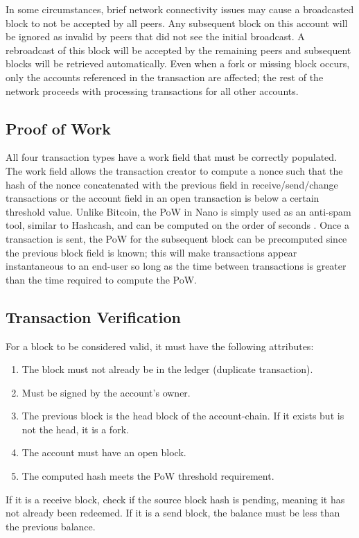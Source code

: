In some circumstances, brief network connectivity issues may cause a broadcasted block to not be accepted by all peers. Any subsequent block on this account will be ignored as invalid by peers that did not see the initial broadcast. A rebroadcast of this block will be accepted by the remaining peers and subsequent blocks will be retrieved automatically. Even when a fork or missing block occurs, only the accounts referenced in the transaction are affected; the rest of the network proceeds with processing transactions for all other accounts.

\subsection{Proof of Work} \label{sec:pow}
All four transaction types have a work field that must be correctly populated. The work field allows the transaction creator to compute a nonce such that the hash of the nonce concatenated with the previous field in receive/send/change transactions or the account field in an open transaction is below a certain threshold value. Unlike Bitcoin, the PoW in Nano is simply used as an anti-spam tool, similar to Hashcash, and can be computed on the order of seconds \cite{Back_hashcash}. Once a transaction is sent, the PoW for the subsequent block can be precomputed since the previous block field is known; this will make transactions appear instantaneous to an end-user so long as the time between transactions is greater than the time required to compute the PoW.

\subsection{Transaction Verification} \label{sec:transaction_verification}
For a block to be considered valid, it must have the following attributes:
\begin{enumerate}
   \item The block must not already be in the ledger (duplicate transaction).
   \item Must be signed by the account's owner.
   \item The previous block is the head block of the account-chain. If it exists but is not the head, it is a fork.
   \item The account must have an open block.
   \item The computed hash meets the PoW threshold requirement.
\end{enumerate}
If it is a receive block, check if the source block hash is pending, meaning it has not already been redeemed. If it is a send block, the balance must be less than the previous balance.